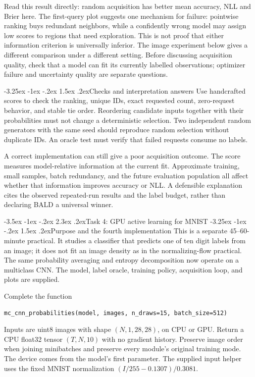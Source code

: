 \documentclass[11pt,a4paper]{article}
\makeatletter
\renewcommand\section{\@startsection{section}{1}{\z@}%
  {-3.5ex \@plus -1ex \@minus -.2ex}%
  {2.3ex \@plus .2ex}{\normalfont\Large}}
\renewcommand\subsection{\@startsection{subsection}{2}{\z@}%
  {-3.25ex \@plus -1ex \@minus -.2ex}%
  {1.5ex \@plus .2ex}{\normalfont\large}}
\makeatother
\begin{document}
Read this result directly: random acquisition has better mean accuracy,
NLL and Brier here. The first-query plot suggests one mechanism for failure:
pointwise ranking buys redundant neighbors, while a confidently wrong model
may assign low scores to regions that need exploration. This is not proof
that either information criterion is universally inferior. The image
experiment below gives a different comparison under a different setting.
Before discussing acquisition quality, check that a model can fit its
currently labelled observations; optimizer failure and uncertainty quality
are separate questions.

\subsection{Checks and interpretation answers}
Use handcrafted scores to check the ranking, unique IDs, exact requested
count, zero-request behavior, and stable tie order. Reordering candidate
inputs together with their probabilities must not change a deterministic
selection. Two independent random generators with the same seed should
reproduce random selection without duplicate IDs. An oracle test must verify
that failed requests consume no labels.

A correct implementation can still give a poor acquisition outcome. The
score measures model-relative information at the current fit. Approximate
training, small samples, batch redundancy, and the future evaluation
population all affect whether that information improves accuracy or NLL.
A defensible explanation cites the observed repeated-run results and the
label budget, rather than declaring BALD a universal winner.

\section{Task 4: GPU active learning for MNIST}
\subsection{Purpose and the fourth implementation}
This is a separate 45--60-minute practical. It studies a classifier that predicts
one of ten digit labels from an image; it does not fit an image density as in
the normalizing-flow practical. The same probability averaging and entropy
decomposition now operate on a multiclass CNN. The model, label oracle,
training policy, acquisition loop, and plots are supplied.

Complete the function
\begin{lstlisting}
mc_cnn_probabilities(model, images, n_draws=15, batch_size=512)
\end{lstlisting}
Inputs are uint8 images with shape $(N,1,28,28)$, on CPU or GPU. Return a CPU
float32 tensor $(T,N,10)$ with no gradient history. Preserve image order when
joining minibatches and preserve every module's original training mode.
The device comes from the model's first parameter. The supplied input helper
uses the fixed MNIST normalization $(I/255-0.1307)/0.3081$.
\end{document}

